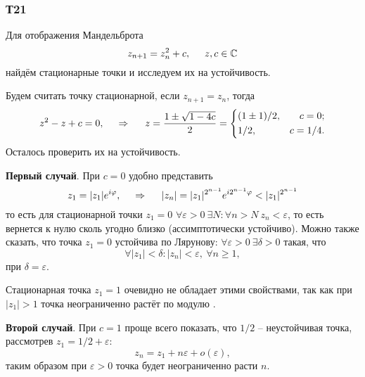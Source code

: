\subsubsection*{Т21}

Для отображения Мандельброта 
\begin{equation*}
    z_{n+1} = z_n^2 + c, \hspace{5 mm} z, c \in \mathbb{C}
\end{equation*}
найдём стационарные точки и исследуем их на устойчивость.

Будем считать точку стационарной, если $z_{n+1} = z_n$, тогда
\begin{equation*}
    z^2 - z + c = 0,
    \hspace{0.5cm} \Rightarrow \hspace{0.5cm}
    z = \frac{1 \pm \sqrt{1-4 c}}{2} = \left\{\begin{aligned}
        &(1 \pm 1)/2, &c=0; \\
        &1/2, & c={1}/{4}.
    \end{aligned}\right.
\end{equation*}
Осталось проверить их на устойчивость. 

\textbf{Первый случай}. При $c = 0$ удобно представить 
\begin{equation*}
    z_1 = |z_1| e^{i \varphi}, 
    \hspace{0.5cm} \Rightarrow \hspace{0.5cm}
    |z_n| = |z_1|^{2^{n-1}} e^{i 2^{n-1} \varphi} < |z_1|^{2^{n-1}}
\end{equation*}
то есть для стационарной точки $z_1 = 0$ $\forall \varepsilon > 0 \ \exists N \colon  \forall n > N \ z_n < \varepsilon$, то есть вернется к нулю сколь угодно близко (ассимптотически устойчиво). Можно также сказать, что точка $z_1 = 0$ устойчива по Лярунову: $\forall \varepsilon >  0 \ \exists \delta > 0$ такая, что 
\begin{equation*}
    \forall |z_1| < \delta\colon |z_n| < \varepsilon, \ \forall n \geq 1,
\end{equation*}
при $\delta = \varepsilon$.

Стационарная точка $z_1 = 1$ очевидно не обладает этими свойствами, так как при $|z_1|>1$ точка неограниченно растёт по модулю .



\textbf{Второй случай}. При $c = 1$ проще всего показать, что $1/2$ -- неустойчивая точка, рассмотрев $z_1 = 1/2 + \varepsilon$:
\begin{equation*}
    z_n = z_1 + n \varepsilon + o(\varepsilon),
\end{equation*}
таким образом при $\varepsilon > 0$ точка будет неограниченно расти $n$.
